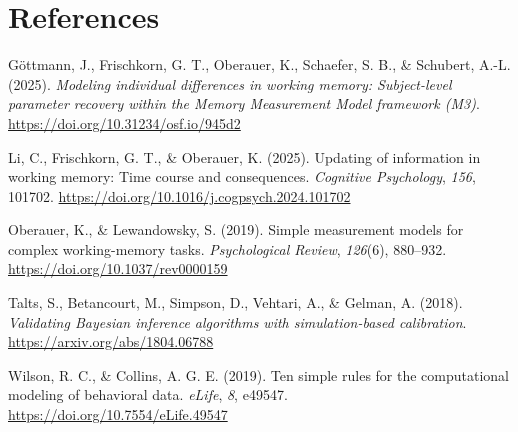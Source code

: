\documentclass[
  man,
  floatsintext,
  longtable,
  nolmodern,
  notxfonts,
  notimes,
  colorlinks=true,linkcolor=blue,citecolor=blue,urlcolor=blue]{apa7}
\newlength{\cslhangindent}
\newenvironment{CSLReferences}[2] %
 {\begin{list}{}{%
  \setlength{\itemindent}{0pt}
  \setlength{\leftmargin}{0pt}
  \setlength{\parsep}{0pt}
  \ifodd #1
   \setlength{\leftmargin}{\cslhangindent}
   \setlength{\itemindent}{-1\cslhangindent}
  \fi
  \setlength{\itemsep}{#2\baselineskip}}}
 {\end{list}}
\begin{document}
\section*{References}\label{references}

\label{refs}
\begin{CSLReferences}{1}{0}
Göttmann, J., Frischkorn, G. T., Oberauer, K., Schaefer, S. B., \&
Schubert, A.-L. (2025). \emph{Modeling individual differences in working
memory: {S}ubject-level parameter recovery within the {M}emory
{M}easurement {M}odel framework ({M3})}.
\url{https://doi.org/10.31234/osf.io/945d2}

Li, C., Frischkorn, G. T., \& Oberauer, K. (2025). Updating of
information in working memory: {T}ime course and consequences.
\emph{Cognitive Psychology}, \emph{156}, 101702.
\url{https://doi.org/10.1016/j.cogpsych.2024.101702}

Oberauer, K., \& Lewandowsky, S. (2019). Simple measurement models for
complex working-memory tasks. \emph{Psychological Review},
\emph{126}(6), 880--932. \url{https://doi.org/10.1037/rev0000159}

Talts, S., Betancourt, M., Simpson, D., Vehtari, A., \& Gelman, A.
(2018). \emph{Validating {B}ayesian inference algorithms with
simulation-based calibration}. \url{https://arxiv.org/abs/1804.06788}

Wilson, R. C., \& Collins, A. G. E. (2019). Ten simple rules for the
computational modeling of behavioral data. \emph{eLife}, \emph{8},
e49547. \url{https://doi.org/10.7554/eLife.49547}

\end{CSLReferences}
\end{document}
